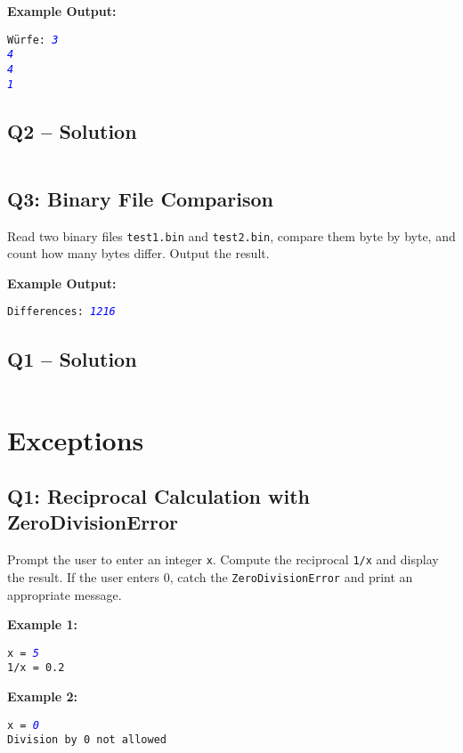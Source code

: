 \documentclass[a4paper,11pt]{article}
\begin{document}
\textbf{Example Output:}
\begin{flushleft}
	\texttt{Würfe: \textcolor{blue}{\textit{3}}}\\
	\texttt{\textcolor{blue}{\textit{4}}}\\
	\texttt{\textcolor{blue}{\textit{4}}}\\
	\texttt{\textcolor{blue}{\textit{1}}}
\end{flushleft}

\subsection*{Q2 – Solution}
\inputminted{python}{Files/12/2.py}


\subsection*{Q3: Binary File Comparison}
Read two binary files \texttt{test1.bin} and \texttt{test2.bin}, compare them byte by byte, and count how many bytes differ. Output the result.

\textbf{Example Output:}
\begin{flushleft}
	\texttt{Differences: \textcolor{blue}{\textit{1216}}}
\end{flushleft}


\subsection*{Q1 – Solution}
\inputminted{python}{Files/12/1.py}

\newpage
\section{Exceptions}

\subsection*{Q1: Reciprocal Calculation with ZeroDivisionError}
Prompt the user to enter an integer \texttt{x}. Compute the reciprocal \texttt{1/x} and display the result. If the user enters 0, catch the \texttt{ZeroDivisionError} and print an appropriate message.

\textbf{Example 1:}
\begin{flushleft}
	\texttt{x = \textcolor{blue}{\textit{5}}}\\
	\texttt{1/x = 0.2}
\end{flushleft}

\textbf{Example 2:}
\begin{flushleft}
	\texttt{x = \textcolor{blue}{\textit{0}}}\\
	\texttt{Division by 0 not allowed}
\end{flushleft}
\end{document}
